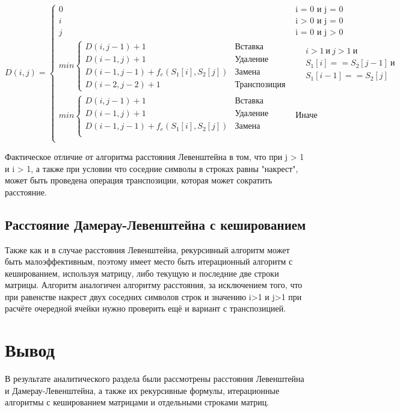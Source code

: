 \begin{equation}
	\label{eq:Dd}
	D(i, j) = 
	\begin{cases}
		0 &\text{i = 0 и j = 0}\\
		i &\text{i > 0 и j = 0}\\
		j &\text{i = 0 и j > 0}\\
		min \begin{cases}
			D(i, j - 1) + 1 &\text{Вставка}\\
			D(i - 1, j) + 1 &\text{Удаление}\\
			D(i - 1, j - 1) + f_e(S_1[i], S_2[j]) &\text{Замена}\\
			D(i - 2, j - 2) + 1 &\text{Транспозиция}
		\end{cases} & \begin{aligned}
		&i > 1 \ и\  j > 1 \ и\ \\ 
		&S_1[i] == S_2[j - 1] \ и \\
		&S_1[i - 1] == S_2[j]\\
		\end{aligned} \\
		min \begin{cases}
			D(i, j - 1) + 1 &\text{Вставка}\\
			D(i - 1, j) + 1 &\text{Удаление}\\
			D(i - 1, j - 1) + f_e(S_1[i], S_2[j]) &\text{Замена}\\
		\end{cases} &\text{Иначе}\\
	\end{cases}
\end{equation}

Фактическое отличие от алгоритма расстояния Левенштейна в том, что при j > 1 и i > 1, а также при условии что соседние символы в строках равны "накрест", может быть проведена операция транспозиции, которая может сократить расстояние.

\subsection{Расстояние Дамерау-Левенштейна с кешированием}
Также как и в случае расстояния Левенштейна, рекурсивный алгоритм может быть малоэффективным, поэтому имеет место быть итерационный алгоритм с кешированием, используя матрицу, либо текущую и последние две строки матрицы. Алгоритм аналогичен алгоритму расстояния, за исключением того, что при равенстве накрест двух соседних символов строк и значению i>1 и j>1 при расчёте очередной ячейки нужно проверить ещё и вариант с транспозицией.


\section*{Вывод}
В результате аналитического раздела были рассмотрены расстояния Левенштейна и Дамерау-Левенштейна, а также их рекурсивные формулы, итерационные алгоритмы с кешированием матрицами и отдельными строками матриц.

\clearpage
